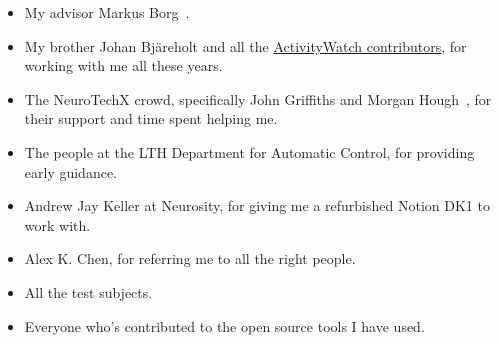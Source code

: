 \begin{itemize}
 \item My advisor Markus Borg~.
 \item My brother Johan Bjäreholt and all the \href{https://activitywatch.net/contributors/}{ActivityWatch contributors}, for working with me all these years.
 \item The NeuroTechX crowd, specifically John Griffiths and Morgan Hough~, for their support and time spent helping me.
 \item The people at the LTH Department for Automatic Control, for providing early guidance.
 \item Andrew Jay Keller at Neurosity, for giving me a refurbished Notion DK1 to work with.
 \item Alex K. Chen, for referring me to all the right people.
 \item All the test subjects.
 \item Everyone who's contributed to the open source tools I have used.
\end{itemize}
